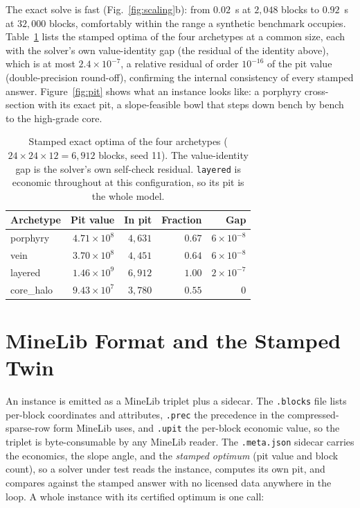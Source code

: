 \documentclass[journal]{IEEEtran}
\begin{document}
The exact solve is fast (Fig.~\ref{fig:scaling}b): from $0.02$~s at $2{,}048$ blocks to $0.92$~s at $32{,}000$
blocks, comfortably within the range a synthetic benchmark occupies. Table~\ref{tab:archetypes} lists the stamped
optima of the four archetypes at a common size, each with the solver's own value-identity gap (the residual of
the identity above), which is at most $2.4\times10^{-7}$, a relative residual of order $10^{-16}$ of the pit
value (double-precision round-off), confirming the internal consistency of every stamped answer. Figure~\ref{fig:pit} shows what an instance looks like: a porphyry cross-section with its exact pit, a
slope-feasible bowl that steps down bench by bench to the high-grade core.

\begin{table}[!t]
\centering
\caption{Stamped exact optima of the four archetypes ($24\!\times\!24\!\times\!12 = 6{,}912$ blocks, seed 11).
The value-identity gap is the solver's own self-check residual. \texttt{layered} is economic throughout at this
configuration, so its pit is the whole model.}
\label{tab:archetypes}
\footnotesize
\begin{tabular}{@{}l r r r r@{}}
\toprule
Archetype & Pit value & In pit & Fraction & Gap \\
\midrule
porphyry   & $4.71\times10^{8}$ & $4{,}631$ & $0.67$ & $6\times10^{-8}$ \\
vein       & $3.70\times10^{8}$ & $4{,}451$ & $0.64$ & $6\times10^{-8}$ \\
layered    & $1.46\times10^{9}$ & $6{,}912$ & $1.00$ & $2\times10^{-7}$ \\
core\_halo & $9.43\times10^{7}$ & $3{,}780$ & $0.55$ & $0$ \\
\bottomrule
\end{tabular}
\end{table}

\section{MineLib Format and the Stamped Twin}\label{sec:minelib}

An instance is emitted as a MineLib triplet plus a sidecar. The \texttt{.blocks} file lists per-block
coordinates and attributes, \texttt{.prec} the precedence in the compressed-sparse-row form MineLib uses, and
\texttt{.upit} the per-block economic value, so the triplet is byte-consumable by any MineLib reader. The
\texttt{.meta.json} sidecar carries the economics, the slope angle, and the \emph{stamped optimum} (pit value and
block count), so a solver under test reads the instance, computes its own pit, and compares against the stamped
answer with no licensed data anywhere in the loop. A whole instance with its certified optimum is one call:
\end{document}
